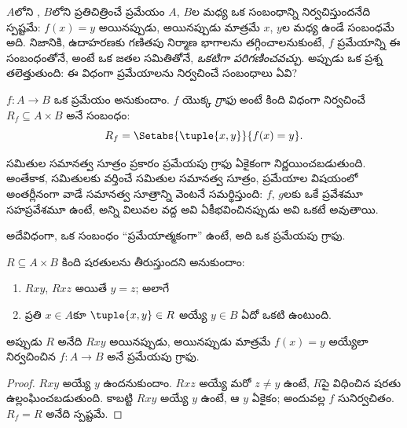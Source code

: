 \documentclass[../../../include/open-logic-section]{subfiles}
\begin{document}


\begin{explain}
$A$లోని , $B$లోని 
ప్రతిచిత్రించే ప్రమేయం $A$, $B$ల మధ్య ఒక సంబంధాన్ని నిర్వచిస్తుందనేది
స్పష్టమే: $f(x) = y$ అయినప్పుడు, అయినప్పుడు మాత్రమే $x$, $y$ల మధ్య ఉండే
సంబంధమే అది. నిజానికి, ఉదాహరణకు గణితపు నిర్మాణ భాగాలను తగ్గించాలనుకుంటే,
$f$ ప్రమేయాన్ని ఈ సంబంధంతోనే, అంటే ఒక జతల సమితితోనే,
\emph{ఒకటిగా పరిగణించవచ్చు}. అప్పుడు ఒక ప్రశ్న తలెత్తుతుంది:
ఈ విధంగా ప్రమేయాలను నిర్వచించే సంబంధాలు ఏవి?
\end{explain}

\begin{defn}[ప్రమేయపు గ్రాఫు]
$f\colon A \to B$ ఒక ప్రమేయం అనుకుందాం.
$f$ యొక్క \emph{గ్రాఫు} అంటే కింది విధంగా నిర్వచించే
$R_f \subseteq A \times B$ అనే సంబంధం:
\[
R_f = \Setabs{\tuple{x,y}}{f(x) = y}.
\]
\end{defn}

\begin{explain}
సమితుల సమానత్వ సూత్రం ప్రకారం ప్రమేయపు గ్రాఫు ఏకైకంగా నిర్ణయించబడుతుంది.
అంతేకాక, సమితులకు వర్తించే సమితుల సమానత్వ సూత్రం, ప్రమేయాల విషయంలో
అంతర్లీనంగా వాడే సమానత్వ సూత్రాన్ని వెంటనే సమర్థిస్తుంది:
$f$, $g$లకు ఒకే ప్రవేశమూ సహప్రవేశమూ ఉంటే, అన్ని విలువల వద్ద అవి
ఏకీభవించినప్పుడు అవి ఒకటే అవుతాయి.

అదేవిధంగా, ఒక సంబంధం ``ప్రమేయాత్మకంగా'' ఉంటే, అది ఒక ప్రమేయపు గ్రాఫు.
\end{explain}

\begin{prop}
$R \subseteq A \times B$ కింది షరతులను తీరుస్తుందని అనుకుందాం:
\begin{enumerate}
\item $Rxy$, $Rxz$ అయితే $y = z$; అలాగే
\item ప్రతి $x \in A$కూ $\tuple{x,y} \in R$ అయ్యే $y \in B$ ఏదో ఒకటి ఉంటుంది.
\end{enumerate}
అప్పుడు $R$ అనేది $Rxy$ అయినప్పుడు, అయినప్పుడు మాత్రమే $f(x) = y$ అయ్యేలా
నిర్వచించిన $f\colon A \to B$ అనే ప్రమేయపు గ్రాఫు.
\end{prop}

\begin{proof}
$Rxy$ అయ్యే $y$ ఉందనుకుందాం.
$Rxz$ అయ్యే మరో $z \neq y$ ఉంటే, $R$పై విధించిన షరతు ఉల్లంఘించబడుతుంది.
కాబట్టి $Rxy$ అయ్యే $y$ ఉంటే, ఆ $y$ ఏకైకం; అందువల్ల $f$ సునిర్వచితం.
$R_f = R$ అనేది స్పష్టమే.
\end{proof}
\end{document}
